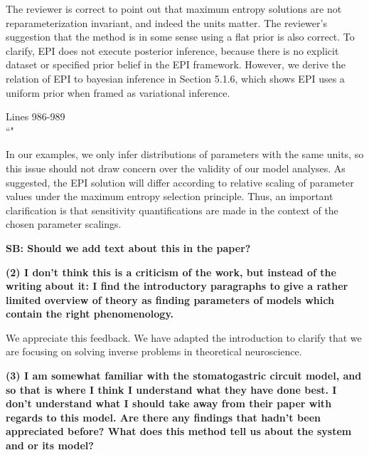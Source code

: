 \documentclass[11pt,a4paper]{article}
\begin{document}
The reviewer is correct to point out that maximum entropy solutions are not reparameterization invariant, and indeed the units matter.  The reviewer’s suggestion that the method is in some sense using a flat prior is also correct.  To clarify, EPI does not execute posterior inference, because there is no explicit dataset or specified prior belief in the EPI framework.  However, we derive the relation of EPI to bayesian inference in Section 5.1.6, which shows EPI uses a uniform prior when framed as variational inference.

\begin{displayquote}
Lines 986-989 \\
``"
\end{displayquote}
 
In our examples, we only infer distributions of parameters with the same units, so this issue should not draw concern over the validity of our model analyses.  As suggested, the EPI solution will differ according to relative scaling of parameter values under the maximum entropy selection principle. Thus, an important clarification is that sensitivity quantifications are made in the context of the chosen parameter scalings. 

\textbf{SB: Should we add text about this in the paper?}

\textbf{(2) I don't think this is a criticism of the work, but instead of the writing about it: I find the introductory paragraphs to give a rather limited overview of theory as finding parameters of models which contain the right phenomenology. }

We appreciate this feedback.  We have adapted the introduction to clarify that we are focusing on solving inverse problems in theoretical neuroscience.

\textbf{(3) I am somewhat familiar with the stomatogastric circuit model, and so that is where I think I understand what they have done best. I don't understand what I should take away from their paper with regards to this model. Are there any findings that hadn't been appreciated before? What does this method tell us about the system and or its model? }
\end{document}

